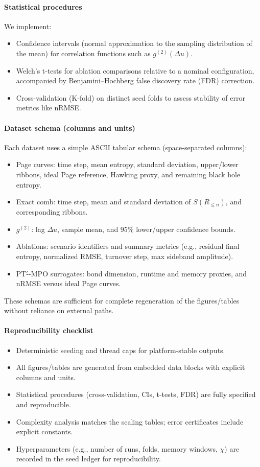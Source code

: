\documentclass[a4paper,11pt]{article}
\newcommand{\eg}{e.g.\xspace}
\theoremstyle{plain}
\theoremstyle{definition}
\theoremstyle{remark}
\begin{document}
\paragraph{Statistical procedures}
We implement:
\begin{itemize}
  \item Confidence intervals (normal approximation to the sampling distribution of the mean) for correlation functions such as $g^{(2)}(\Delta u)$.
  \item Welch's t-tests for ablation comparisons relative to a nominal configuration, accompanied by Benjamini--Hochberg false discovery rate (FDR) correction.
  \item Cross-validation (K-fold) on distinct seed folds to assess stability of error metrics like nRMSE.
\end{itemize}

\paragraph{Dataset schema (columns and units)}
Each dataset uses a simple ASCII tabular schema (space-separated columns):
\begin{itemize}
  \item Page curves: time step, mean entropy, standard deviation, upper/lower ribbons, ideal Page reference, Hawking proxy, and remaining black hole entropy.
  \item Exact comb: time step, mean and standard deviation of $S(R_{\le n})$, and corresponding ribbons.
  \item $g^{(2)}$: lag $\Delta u$, sample mean, and 95\% lower/upper confidence bounds.
  \item Ablations: scenario identifiers and summary metrics (\eg, residual final entropy, normalized RMSE, turnover step, max sideband amplitude).
  \item PT\'--MPO surrogates: bond dimension, runtime and memory proxies, and nRMSE versus ideal Page curves.
\end{itemize}
These schemas are sufficient for complete regeneration of the figures/tables without reliance on external paths.

\paragraph{Reproducibility checklist}
\begin{itemize}
  \item Deterministic seeding and thread caps for platform-stable outputs.
  \item All figures/tables are generated from embedded data blocks with explicit columns and units.
  \item Statistical procedures (cross-validation, CIs, t-tests, FDR) are fully specified and reproducible.
  \item Complexity analysis matches the scaling tables; error certificates include explicit constants.
  \item Hyperparameters (\eg, number of runs, folds, memory windows, $\chi$) are recorded in the seed ledger for reproducibility.
\end{itemize}
\end{document}
